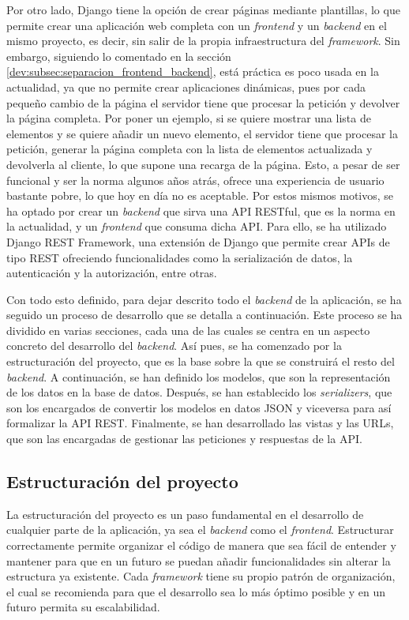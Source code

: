 Por otro lado, Django tiene la opción de crear páginas mediante plantillas, lo que permite crear una aplicación web completa con un \textit{frontend} y un \textit{backend} en el mismo proyecto, es decir, sin salir de la propia infraestructura del \textit{framework}. Sin embargo, siguiendo lo comentado en la sección \ref{dev:subsec:separacion_frontend_backend}, está práctica es poco usada en la actualidad, ya que no permite crear aplicaciones dinámicas, pues por cada pequeño cambio de la página el servidor tiene que procesar la petición y devolver la página completa. Por poner un ejemplo, si se quiere mostrar una lista de elementos y se quiere añadir un nuevo elemento, el servidor tiene que procesar la petición, generar la página completa con la lista de elementos actualizada y devolverla al cliente, lo que supone una recarga de la página. Esto, a pesar de ser funcional y ser la norma algunos años atrás, ofrece una experiencia de usuario bastante pobre, lo que hoy en día no es aceptable. Por estos mismos motivos, se ha optado por crear un \textit{backend} que sirva una API RESTful, que es la norma en la actualidad, y un \textit{frontend} que consuma dicha API. Para ello, se ha utilizado Django REST Framework, una extensión de Django que permite crear APIs de tipo REST ofreciendo funcionalidades como la serialización de datos, la autenticación y la autorización, entre otras.

Con todo esto definido, para dejar descrito todo el \textit{backend} de la aplicación, se ha seguido un proceso de desarrollo que se detalla a continuación. Este proceso se ha dividido en varias secciones, cada una de las cuales se centra en un aspecto concreto del desarrollo del \textit{backend}. Así pues, se ha comenzado por la estructuración del proyecto, que es la base sobre la que se construirá el resto del \textit{backend}. A continuación, se han definido los modelos, que son la representación de los datos en la base de datos. Después, se han establecido los \textit{serializers}, que son los encargados de convertir los modelos en datos JSON y viceversa para así formalizar la API REST. Finalmente, se han desarrollado las vistas y las URLs, que son las encargadas de gestionar las peticiones y respuestas de la API.

\subsection{Estructuración del proyecto}
\label{dev:subsec:estructura_proyecto}

La estructuración del proyecto es un paso fundamental en el desarrollo de cualquier parte de la aplicación, ya sea el \textit{backend} como el \textit{frontend}. Estructurar correctamente permite organizar el código de manera que sea fácil de entender y mantener para que en un futuro se puedan añadir funcionalidades sin alterar la estructura ya existente. Cada \textit{framework} tiene su propio patrón de organización, el cual se recomienda para que el desarrollo sea lo más óptimo posible y en un futuro permita su escalabilidad.

